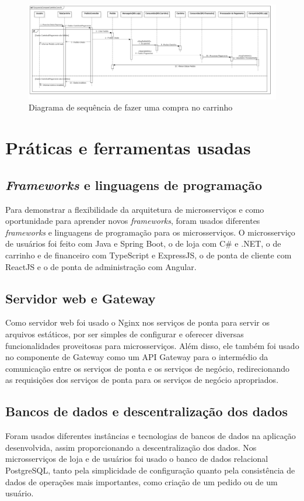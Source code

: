 \begin{figure}[htb]
	\caption{\label{figura-diagrama-de-sequencia}Diagrama de sequência de fazer uma compra no carrinho}
	\begin{center}
	    \includegraphics[scale=0.16]{Diagramas/imagens/SequenciaComprarCarrinhoComAlt.jpg}
	\end{center}
\end{figure}


\section{Práticas e ferramentas usadas}
\subsection*{\emph{Frameworks} e linguagens de programação}
Para demonstrar a flexibilidade da arquitetura de microsserviços e como oportunidade para aprender novos \emph{frameworks}, foram usados diferentes \emph{frameworks} e linguagens de programação para os microsserviços. O microsserviço de usuários foi feito com Java e Spring Boot, o de loja com C\# e .NET, o de carrinho e de financeiro com TypeScript e ExpressJS, o de ponta de cliente com ReactJS e o de ponta de administração com Angular.

\subsection*{Servidor web e Gateway}
Como servidor web foi usado o Nginx nos serviços de ponta para servir os arquivos estáticos, por ser simples de configurar e oferecer diversas funcionalidades proveitosas para microsserviços. Além disso, ele também foi usado no componente de Gateway como um API Gateway para o intermédio da comunicação entre os serviços de ponta e os serviços de negócio, redirecionando as requisições dos serviços de ponta para os serviços de negócio apropriados.

\subsection*{Bancos de dados e descentralização dos dados}
Foram usados diferentes instâncias e tecnologias de bancos de dados na aplicação desenvolvida, assim proporcionando a descentralização dos dados. Nos microsserviços de loja e de usuários foi usado o banco de dados relacional PostgreSQL, tanto pela simplicidade de configuração quanto pela consistência de dados de operações mais importantes, como criação de um pedido ou de um usuário.

